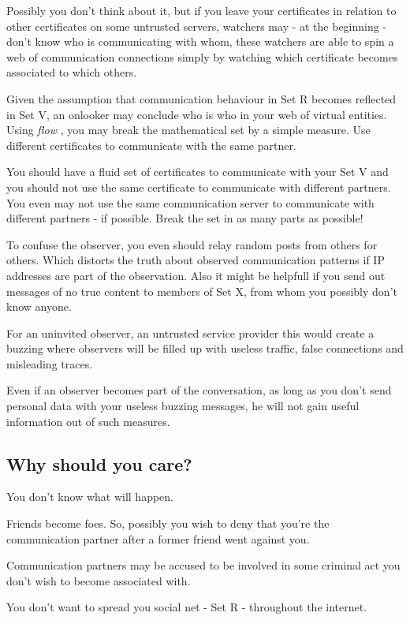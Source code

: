\documentclass[twoside,a4paper,english,12pt,authoryear,openright]{book}
\newcommand{\flow}{\textit{flow} }
\begin{document}
Possibly you don't think about it, but if you leave your certificates in relation to other certificates on some untrusted servers, watchers may - at the beginning - don't know who is communicating with whom, these watchers are able to spin a web of communication connections simply by watching which certificate becomes associated to which others.

Given the assumption that communication behaviour in Set R becomes reflected in Set V, an onlooker may conclude who is who in your web of virtual entities. Using \flow, you may break the mathematical set by a simple measure. Use different certificates to communicate with the same partner.

You should have a fluid set of certificates to communicate with your Set V and you should not use the same certificate to communicate with different partners. You even may not use the same communication server to communicate with different partners - if possible. Break the set in as many parts as possible!

To confuse the observer, you even should relay random posts from others for others. Which distorts the truth about observed communication patterns if IP addresses are part of the observation. Also it might be helpfull if you send out messages of no true content to members of Set X, from whom you possibly don't know anyone.

For an uninvited observer, an untrusted service provider this would create a buzzing where observers will be filled up with useless traffic, false connections and misleading traces.

Even if an observer becomes part of the conversation, as long as you don't send personal data with your useless buzzing messages, he will not gain useful information out of such measures.


\subsection{Why should you care?}

You don't know what will happen.

Friends become foes. So, possibly you wish to deny that you're the communication partner after a former friend went against you.

Communication partners may be accused to be involved in some criminal act you don't wish to become associated with.

You don't want to spread you social net - Set R - throughout the internet.
\end{document}
